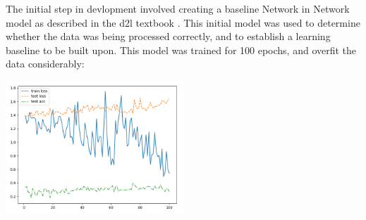 \documentclass{article}[12pt]
\begin{document}
\indent
The initial step in devlopment involved creating a baseline Network in Network model as described in the d2l textbook \cite{d2l}. This initial model was used to determine whether the data was being processed correctly, and to establish a learning baseline to be built upon. This model was trained for 100 epochs, and overfit the data considerably: \\

\begin{center}
    \includegraphics[width=0.5\textwidth]{images/basic_model.png}
\end{center}
\end{document}
